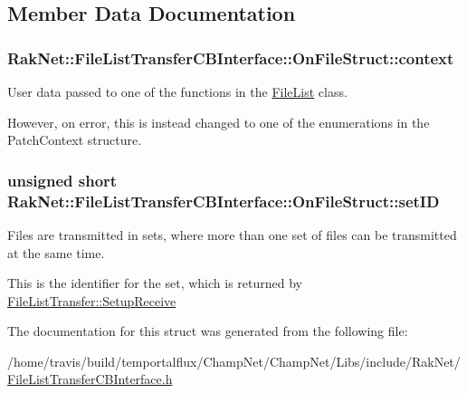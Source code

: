 \subsection{Member Data Documentation}
\hypertarget{struct_rak_net_1_1_file_list_transfer_c_b_interface_1_1_on_file_struct_ad9134e6310c8a685a6db27de4d81b32e}{
\subsubsection[{context}]{ Rak\-Net\-::\-File\-List\-Transfer\-C\-B\-Interface\-::\-On\-File\-Struct\-::context}}\label{struct_rak_net_1_1_file_list_transfer_c_b_interface_1_1_on_file_struct_ad9134e6310c8a685a6db27de4d81b32e}


User data passed to one of the functions in the \hyperlink{class_rak_net_1_1_file_list}{File\-List} class. 

However, on error, this is instead changed to one of the enumerations in the Patch\-Context structure. \hypertarget{struct_rak_net_1_1_file_list_transfer_c_b_interface_1_1_on_file_struct_abbfbb86de031c99ac81438e1d4a350b4}{
\subsubsection[{set\-I\-D}]{\setlength{\rightskip}{0pt plus 5cm}unsigned short Rak\-Net\-::\-File\-List\-Transfer\-C\-B\-Interface\-::\-On\-File\-Struct\-::set\-I\-D}}\label{struct_rak_net_1_1_file_list_transfer_c_b_interface_1_1_on_file_struct_abbfbb86de031c99ac81438e1d4a350b4}


Files are transmitted in sets, where more than one set of files can be transmitted at the same time. 

This is the identifier for the set, which is returned by \hyperlink{class_rak_net_1_1_file_list_transfer_afc31c7d166bfb3fb60944624e27ce388}{File\-List\-Transfer\-::\-Setup\-Receive} 

The documentation for this struct was generated from the following file\-:\begin{DoxyCompactItemize}
\item 
/home/travis/build/temportalflux/\-Champ\-Net/\-Champ\-Net/\-Libs/include/\-Rak\-Net/\hyperlink{_file_list_transfer_c_b_interface_8h}{File\-List\-Transfer\-C\-B\-Interface.\-h}\end{DoxyCompactItemize}
